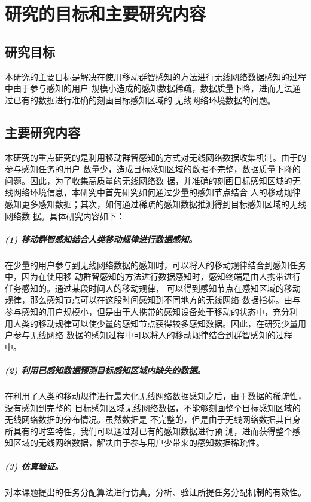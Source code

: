 \documentclass[UTF8]{ctexart}
\begin{document}
\section{研究的目标和主要研究内容}
\subsection{研究目标}

本研究的主要目标是解决在使用移动群智感知的方法进行无线网络数据感知的过程中由于参与感知的用户
规模小造成的感知数据稀疏，数据质量下降，进而无法通过已有的数据进行准确的刻画目标感知区域的
无线网络环境数据的问题。

\subsection{主要研究内容}

本研究的重点研究的是利用移动群智感知的方式对无线网络数据收集机制。由于的参与感知任务的用户
数量少，造成目标感知区域的数据不完整，数据质量下降的问题。因此，为了收集高质量的无线网络数
据，并准确的刻画目标感知区域的无线网络环境信息，本研究中首先研究如何通过少量的感知节点结合
人的移动规律感知更多感知数据；其次，如何通过稀疏的感知数据推测得到目标感知区域的无线网络数
据。具体研究内容如下：

\subparagraph{(1) 移动群智感知结合人类移动规律进行数据感知。}

在少量的用户参与到无线网络数据的感知时，可以将人的移动规律结合到感知任务中，因为在使用移
动群智感知的方法进行数据感知时，感知终端是由人携带进行任务感知的。通过某段时间人的移动规律，
可以得到感知节点在感知区域的移动规律，那么感知节点可以在这段时间感知到不同地方的无线网络
数据指标。由与参与感知的用户规模小，但是由于人携带的感知设备处于移动的状态中，充分利
用人类的移动规律可以使少量的感知节点获得较多感知数据。因此，在研究少量用户参与无线网络
数据的感知过程中可以将人的移动规律结合到群智感知的过程中。

\subparagraph{(2) 利用已感知数据预测目标感知区域内缺失的数据。}

在利用了人类的移动规律进行最大化无线网络数据感知之后，由于数据的稀疏性，没有感知到完整的
目标感知区域无线网络数据，不能够刻画整个目标感知区域的无线网络数据的分布情况。虽然数据是
不完整的，但是由于无线网络数据其自身所具有的时空特性，我们可以通过对已有的感知数据进行预
测，进而获得整个感知区域的无线网络数据，解决由于参与用户少带来的感知数据稀疏性。

\subparagraph{(3) 仿真验证。}

对本课题提出的任务分配算法进行仿真，分析、验证所提任务分配机制的有效性。
\end{document}
